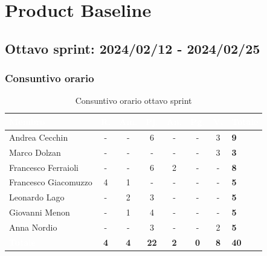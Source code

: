 \newpage

\section{Product Baseline}
\subsection{Ottavo sprint: 2024/02/12 - 2024/02/25}
\subsubsection{Consuntivo orario}
{
\setlength{\tabcolsep}{10pt}
\renewcommand{\arraystretch}{1.5}
\begin{table}[h!]
    \centering
    \begin{tabularx}{\textwidth}{| l | c | c | c | c | c | c | X |}
        \hline
        \rowcolor{headerrow} \textbf{\textcolor{white}{Membro}} & \textbf{\textcolor{white}{R.}} & \textbf{\textcolor{white}{Am.}} & \textbf{\textcolor{white}{Pj.}} & \textbf{\textcolor{white}{An.}} & \textbf{\textcolor{white}{Pg.}} & \textbf{\textcolor{white}{V.}} & \textbf{\textcolor{white}{Totale}} \\
        \hline
        Andrea Cecchin & - & - & 6 & - & - & 3 & \textbf{9} \\
        \hline
        Marco Dolzan & - & - & - & - & - & 3 & \textbf{3} \\
        \hline
        Francesco Ferraioli & - & - & 6 & 2 & - & - & \textbf{8} \\
        \hline  
        Francesco Giacomuzzo & 4 & 1 & - & - & - & - & \textbf{5} \\
        \hline
        Leonardo Lago & - & 2 & 3 & - & - & - & \textbf{5} \\
        \hline
        Giovanni Menon & - & 1 & 4 & - & - & - & \textbf{5} \\
        \hline
        Anna Nordio & - & - & 3 & - & - & 2 & \textbf{5} \\
        \hline
    \cellcolor{headerrow} \textbf{\textcolor{white}{Totale}} & \textbf{4} & \textbf{4} & \textbf{22} & \textbf{2} & \textbf{0} & \textbf{8} & \textbf{40} \\
        \hline
    \end{tabularx} 
    \caption{Consuntivo orario ottavo sprint}
    \label{tab:consuntivoorarioottavosprint}
\end{table}
}

